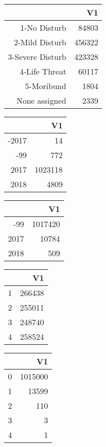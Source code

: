 \bigskip\bigskip
\centering
\begin{tabular}{rr}
  \hline
 & V1 \\ 
  \hline
1-No Disturb & 84803 \\ 
  2-Mild Disturb & 456322 \\ 
  3-Severe Disturb & 423328 \\ 
  4-Life Threat & 60117 \\ 
  5-Moribund & 1804 \\ 
  None assigned & 2339 \\ 
   \hline
\end{tabular}

\bigskip\bigskip
\centering
\begin{tabular}{rr}
  \hline
 & V1 \\ 
  \hline
-2017 &  14 \\ 
  -99 & 772 \\ 
  2017 & 1023118 \\ 
  2018 & 4809 \\ 
   \hline
\end{tabular}

\bigskip\bigskip
\centering
\begin{tabular}{rr}
  \hline
 & V1 \\ 
  \hline
-99 & 1017420 \\ 
  2017 & 10784 \\ 
  2018 & 509 \\ 
   \hline
\end{tabular}

\bigskip\bigskip
\centering
\begin{tabular}{rr}
  \hline
 & V1 \\ 
  \hline
1 & 266438 \\ 
  2 & 255011 \\ 
  3 & 248740 \\ 
  4 & 258524 \\ 
   \hline
\end{tabular}

\bigskip\bigskip
\centering
\begin{tabular}{rr}
  \hline
 & V1 \\ 
  \hline
0 & 1015000 \\ 
  1 & 13599 \\ 
  2 & 110 \\ 
  3 &   3 \\ 
  4 &   1 \\ 
   \hline
\end{tabular}

